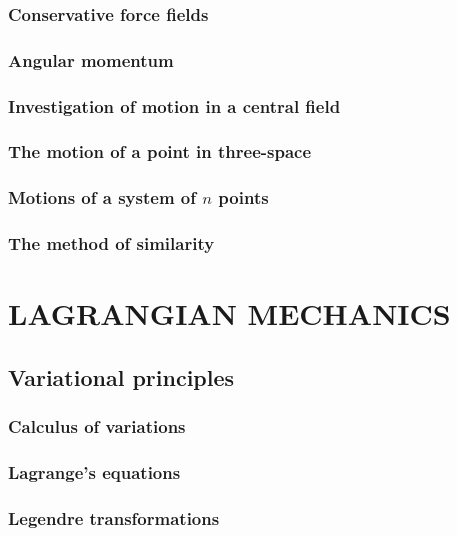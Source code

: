 \documentclass{book}
\numberwithin{equation}{section}
\theoremstyle{plain}
\theoremstyle{definition}
\theoremstyle{remark}
\theoremstyle{smallcap}
\numberwithin{prob}{section}
\begin{document}
\section{Conservative force fields}

\section{Angular momentum}

\section{Investigation of motion in a central field}

\section{The motion of a point in three-space}

\section{Motions of a system of $n$ points}

\section{The method of similarity}

\part{LAGRANGIAN MECHANICS}

\chapter{Variational principles}

\section{Calculus of variations}

\section{Lagrange's equations}

\section{Legendre transformations}
\end{document}
